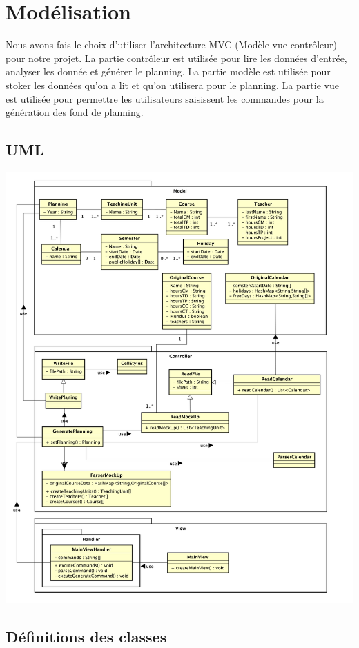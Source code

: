 \documentclass{polytech/polytech}
\begin{document}
	\pagebreak
	\section{Modélisation}
	Nous avons fais le choix d'utiliser l'architecture MVC (Modèle-vue-contrôleur) pour notre projet.
	La partie contrôleur est utilisée pour lire les données d'entrée, analyser les donnée et générer le planning.
	La partie modèle est utilisée pour stoker les données qu'on a lit et qu'on utilisera pour le planning.
	La partie vue est utilisée pour permettre les utilisateurs saisissent les commandes pour la génération des fond de planning.
	\subsection{UML}
	\includegraphics[scale=0.2]{./img/Diagram.png}
	\pagebreak

	\subsection{Définitions des classes}
\end{document}
